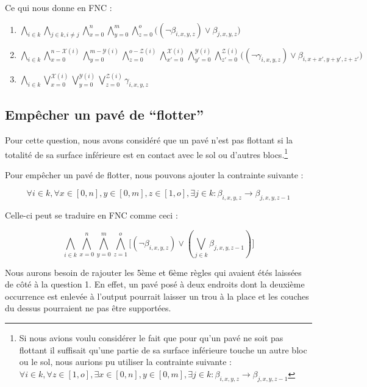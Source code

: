 \documentclass[a4paper]{article}
\begin{document}
Ce qui nous donne en FNC :

\begin{enumerate}
  \item $
  \bigwedge_{i \in k} \bigwedge_{j \in k, i \neq j}
  \bigwedge_{x=0}^{n} \bigwedge_{y=0}^{m} \bigwedge_{z=0}^{o}
  \Big( (\lnot \beta_{i, x, y, z}) \lor \beta_{j, x, y, z} \Big)
  $

  \item $
  \bigwedge_{i \in k}
  \bigwedge_{x=0}^{n - \mathcal{X}(i)} \bigwedge_{y=0}^{m - \mathcal{Y}(i)} \bigwedge_{z=0}^{o - \mathcal{Z}(i)}
  \bigwedge_{x'=0}^{\mathcal{X}(i)} \bigwedge_{y'=0}^{\mathcal{Y}(i)} \bigwedge_{z'=0}^{\mathcal{Z}(i)}
  \Big( (\lnot \gamma_{i, x, y, z}) \lor \beta_{i, x+x', y+y', z+z'} \Big)
  $

  \item $
  \bigwedge_{i \in k}
  \bigvee_{x=0}^{\mathcal{X}(i)} \bigvee_{y=0}^{\mathcal{Y}(i)} \bigvee_{z=0}^{\mathcal{Z}(i)}
  \gamma_{i, x, y, z}
  $
\end{enumerate}

\subsection{Empêcher un pavé de ``flotter''}

Pour cette question, nous avons considéré que un pavé n'est pas flottant si la totalité de sa surface inférieure est en contact avec le sol ou d'autres blocs.\footnote{Si nous avions voulu considérer le fait que pour qu'un pavé ne soit pas flottant il suffisait qu'une partie de sa surface inférieure touche un autre bloc ou le sol, nous aurions pu utiliser la contrainte suivante : $
\forall i \in k, \forall z \in [1, o], \exists x \in [0, n], y \in [0, m],
\exists j \in k : \beta_{i, x, y, z} \rightarrow \beta_{j, x, y, z-1}
$}

Pour empêcher un pavé de flotter, nous pouvons ajouter la contrainte suivante :

$$
\forall i \in k, \forall x \in [0, n], y \in [0, m], z \in [1, o],
\exists j \in k : \beta_{i, x, y, z} \rightarrow \beta_{j, x, y, z-1}
$$

Celle-ci peut se traduire en FNC comme ceci :

$$
\bigwedge_{i \in k}
  \bigwedge_{x=0}^{n} \bigwedge_{y=0}^{m} \bigwedge_{z=1}^{o}
  \Big[
  (\lnot \beta_{i, x, y, z}) \lor (\bigvee_{j \in k} \beta_{j, x, y, z-1})
  \Big]
$$

Nous aurons besoin de rajouter les 5ème et 6ème règles qui avaient étés laissées de côté à la question 1. En effet, un pavé posé à deux endroits dont la deuxième occurrence est enlevée à l'output pourrait laisser un trou à la place et les couches du dessus pourraient ne pas être supportées.
\end{document}
